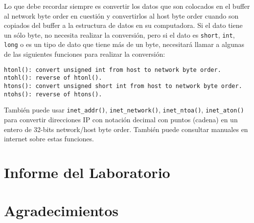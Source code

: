 Lo que debe recordar siempre es convertir los datos que son colocados en el buffer al network byte order en cuestión y convertirlos al host byte order cuando son copiados del buffer a la estructura de datos en su computadora. Si el dato tiene un sólo byte, no necesita realizar la conversión, pero si el dato es {\tt short}, 
{\tt int}, {\tt long} o es un tipo de dato que tiene más de un byte, necesitará llamar a algunas de las siguientes funciones para realizar la conversión:

\begin{lstlisting}
htonl(): convert unsigned int from host to network byte order.
ntohl(): reverse of htonl().
htons(): convert unsigned short int from host to network byte order.
ntohs(): reverse of htons().
\end{lstlisting}


También puede usar {\tt inet\_addr()}, {\tt inet\_network()},
{\tt inet\_ntoa()}, {\tt inet\_aton()} para convertir direcciones IP con notación decimal con puntos (cadena) en un entero de 32-bits network/host byte order. También puede consultar manuales en internet sobre estas funciones.

\section{Informe del Laboratorio}



\section*{Agradecimientos}








